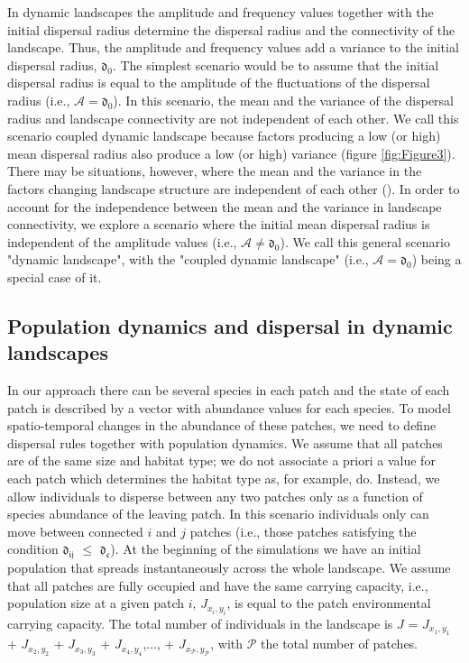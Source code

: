 \documentclass[12pt]{article}
\begin{document}
In dynamic landscapes the amplitude and frequency values together with the initial dispersal  radius determine the dispersal radius and the connectivity of the landscape. Thus, the amplitude and frequency values add a variance to the initial dispersal radius, $\mathfrak{d_{0}}$. The simplest scenario would be to assume that the initial dispersal radius is equal to the amplitude of the fluctuations of the dispersal radius (i.e., $\mathcal{A} = \mathfrak{d_{0}}$). In this scenario, the mean and the variance of the dispersal radius and landscape connectivity are not independent of each other. We call this scenario coupled dynamic landscape because factors producing a low (or high) mean dispersal radius also produce a low (or high) variance (figure \ref{fig:Figure3}). There may be situations, however, where the mean and the variance in the factors changing landscape structure are independent of each other (\cite{Violletal2012}). In order to account for the independence between the mean and the variance in landscape connectivity, we explore a scenario where the initial mean dispersal radius is independent of the amplitude values (i.e., $\mathcal{A} \neq \mathfrak{d_{0}}$). We call this general scenario "dynamic landscape", with the "coupled dynamic landscape" (i.e., $\mathcal{A} = \mathfrak{d_{0}}$) being a special case of it.

\subsection*{Population dynamics and dispersal in dynamic landscapes}

In our approach there can be several species in each patch and the state of each patch is described by a vector with abundance values for each species. To model spatio-temporal changes in the abundance of these patches, we need to
define dispersal rules together with population dynamics. We assume that all patches are of the same size and habitat type; we do not associate a priori a value for each patch which determines the habitat type as, for example, \cite{rybickihanski2013} do. Instead, we allow individuals to disperse between any two patches only as a function of species abundance of the leaving patch. In this scenario individuals only can move between connected $i$ and $j$ patches (i.e., those patches satisfying the condition $\mathfrak{d_{ij}}$ $\leq$ $\mathfrak{d_{c}}$). At the beginning of the simulations we have an initial population that spreads instantaneously across the whole landscape. We assume that all patches are fully occupied and have the same carrying capacity, i.e., population size at a given patch $i$, $J_{x_i,y_i}$, is equal to the patch environmental carrying capacity. The total number of individuals in the landscape is $J$ =
$J_{x_1,y_1}$ + $J_{x_2,y_2}$ + $J_{x_3,y_3}$ + $J_{x_4,y_4}$,..., + $J_{x_\mathcal{P},y_\mathcal{P}}$, with $\mathcal{P}$ the total number of patches.
\end{document}
